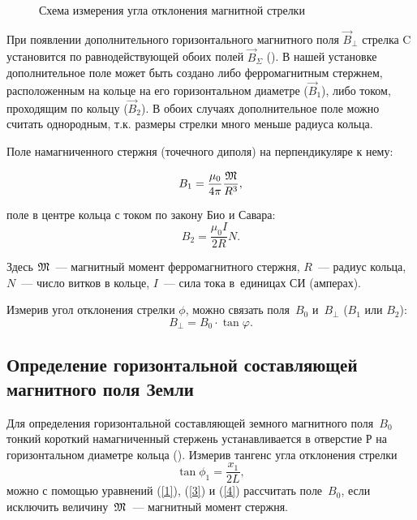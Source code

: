 \begin{wrapfigure}{r}{0.4\textwidth}
	\caption{Схема измерения угла отклонения магнитной стрелки}
\end{wrapfigure}

При появлении дополнительного горизонтального магнитного поля $\vec{B}_{\perp}$ стрелка C установится по равнодействующей
обоих полей $\vec{B}_{\Sigma}$ (). В нашей установке дополнительное поле может быть создано либо ферромагнитным
стержнем, расположенным на кольце на его горизонтальном диаметре ($\vec{B}_1$), либо током, проходящим по кольцу
($\vec{B}_2$). В обоих случаях дополнительное поле можно считать однородным, т.к. размеры стрелки много меньше радиуса
кольца.

Поле намагниченного стержня (точечного диполя) на перпендикуляре к нему:

\begin{equation}
    B_1=\frac{\mu_0}{4\pi}\frac{\mathfrak M}{R^3},
\end{equation}

поле в центре кольца с током по закону Био и Савара:
\begin{equation}
    B_2=\frac{\mu_0 I}{2R}N.
\end{equation}

Здесь $\mathfrak M$~--- магнитный момент ферромагнитного стержня, $R$~--- радиус кольца, $N$~--- число витков в кольце,
$I$~--- сила тока в~единицах СИ (амперах).

Измерив угол отклонения стрелки $\phi$, можно связать поля~$B_0$ и~$B_{\perp}$ ($B_1$ или $B_2$):
\begin{equation}
    B_{\perp}=B_0\cdot \tan{\varphi}.
\end{equation}

\subsection*{Определение горизонтальной составляющей магнитного поля Земли}

Для определения горизонтальной составляющей земного магнитного поля~$B_0$ тонкий короткий намагниченный стержень
устанавливается в отверстие Р на горизонтальном диаметре кольца (). Измерив тангенс угла отклонения стрелки
\begin{equation}
    \tan\phi_1=\frac{x_1}{2L},
\end{equation}
можно с помощью уравнений (\eqref{1}), (\eqref{3}) и (\eqref{4}) рассчитать поле~$B_0$, если исключить величину~$\mathfrak M$~--- магнитный
момент стержня.

